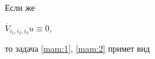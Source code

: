 












Если же

$\overline{V}_{i_1 ,i_2 ,i_3 }u\equiv 0$, 





то задача \eqref{mam:1}, \eqref{mam:2} примет вид

